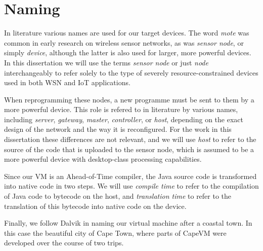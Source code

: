 \section{Naming}
In literature various names are used for our target devices. The word \emph{mote} was common in early research on wireless sensor networks, as was \emph{sensor node}, or simply \emph{device}, although the latter is also used for larger, more powerful devices. In this dissertation we will use the terms \emph{sensor node} or just \emph{node} interchangeably to refer solely to the type of severely resource-constrained devices used in both WSN and IoT applications.


When reprogramming these nodes, a new programme must be sent to them by a more powerful device. This role is refered to in literature by various names, including \emph{server}, \emph{gateway}, \emph{master}, \emph{controller}, or \emph{host}, depending on the exact design of the network and the way it is reconfigured. For the work in this dissertation these differences are not relevant, and we will use \emph{host} to refer to the source of the code that is uploaded to the sensor node, which is assumed to be a more powerful device with desktop-class processing capabilities.

Since our VM is an Ahead-of-Time compiler, the Java source code is transformed into native code in two steps. We will use \emph{compile time} to refer to the compilation of Java code to bytecode on the host, and \emph{translation time} to refer to the translation of this bytecode into native code on the device.

Finally, we follow Dalvik in naming our virtual machine after a coastal town. In this case the beautiful city of Cape Town, where parts of CapeVM were developed over the course of two trips.

